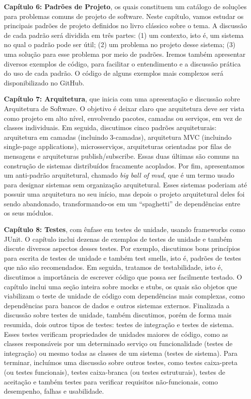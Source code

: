 \documentclass[
  11pt,
  twoside]{book}
\begin{document}
\textbf{Capítulo 6: Padrões de Projeto}, os quais constituem um catálogo
de soluções para problemas comuns de projeto de software. Neste
capítulo, vamos estudar os principais padrões de projeto definidos no
livro clássico sobre o tema. A discussão de cada padrão será dividida em
três partes: (1) um contexto, isto é, um sistema no qual o padrão pode
ser útil; (2) um problema no projeto desse sistema; (3) uma solução para
esse problema por meio de padrões. Iremos também apresentar diversos
exemplos de código, para facilitar o entendimento e a discussão prática
do uso de cada padrão. O código de alguns exemplos mais complexos será
disponibilizado no GitHub.

\textbf{Capítulo 7: Arquitetura}, que inicia com uma apresentação e
discussão sobre Arquitetura de Software. O objetivo é deixar claro que
arquitetura deve ser vista como projeto em alto nível, envolvendo
pacotes, camadas ou serviços, em vez de classes individuais. Em seguida,
discutimos cinco padrões arquiteturais: arquitetura em camadas
(incluindo 3-camadas), arquitetura MVC (incluindo single-page
applications), microsserviços, arquiteturas orientadas por filas de
mensagens e arquiteturas publish/subscribe. Essas duas últimas são
comuns na construção de sistemas distribuídos fracamente acoplados. Por
fim, apresentamos um anti-padrão arquitetural, chamado \emph{big ball of
mud}, que é um termo usado para designar sistemas sem organização
arquitetural. Esses sistemas poderiam até possuir uma arquitetura no seu
início, mas depois o projeto arquitetural deles foi sendo abandonado,
transformando-os em um ``spaghetti'' de dependências entre os seus
módulos.

\textbf{Capítulo 8: Testes}, com ênfase em testes de unidade, usando
frameworks como JUnit. O capítulo inclui dezenas de exemplos de testes
de unidade e também discute diversos aspectos desses testes. Por
exemplo, discutimos bons princípios para escrita de testes de unidade e
também test smells, isto é, padrões de testes que não são recomendados.
Em seguida, tratamos de testabilidade, isto é, discutimos a importância
de escrever código que possa ser facilmente testado. O capítulo inclui
uma seção inteira sobre mocks e stubs, os quais são objetos que
viabilizam o teste de unidade de código com dependências mais complexas,
como dependências para bancos de dados e outros sistemas externos.
Finalizada a discussão sobre testes de unidade, também discutimos, porém
de forma mais resumida, dois outros tipos de testes: testes de
integração e testes de sistema. Esses testes verificam propriedades de
unidades maiores de código, como as classes responsáveis por um
determinado serviço ou funcionalidade (testes de integração) ou mesmo
todas as classes de um sistema (testes de sistema). Para terminar,
incluímos uma discussão sobre outros testes, como testes caixa-preta (ou
testes funcionais), testes caixa-branca (ou testes estruturais), testes
de aceitação e também testes para verificar requisitos não-funcionais,
como desempenho, falhas e usabilidade.
\end{document}
